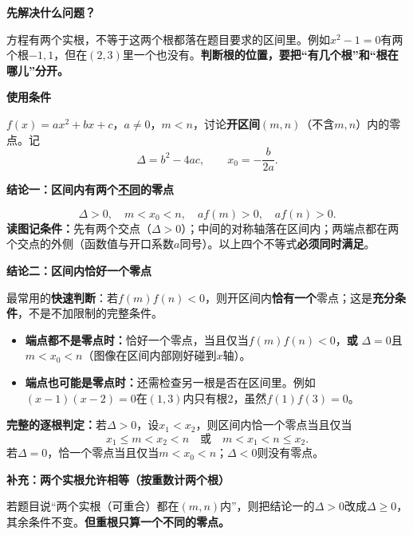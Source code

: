 \begin{statementbox}
\textbf{\textcolor{CStatement}{先解决什么问题？}}\par
方程有两个实根，不等于这两个根都落在题目要求的区间里。例如$x^2-1=0$有两个根$-1,1$，但在$(2,3)$里一个也没有。\textbf{判断根的位置，要把“有几个根”和“根在哪儿”分开。}

\medskip
\textbf{\textcolor{CStatement}{使用条件}}\par
$f(x)=ax^2+bx+c$，$a\ne0$，$m<n$，讨论\textbf{开区间}$(m,n)$（不含$m,n$）内的零点。记
\[\Delta=b^2-4ac,\qquad x_0=-\frac b{2a}.\]

\textbf{\textcolor{CStatement}{结论一：区间内有两个\underline{不同}的零点}}\par
\[
\boxed{\Delta>0,\quad m<x_0<n,\quad af(m)>0,\quad af(n)>0.}
\]
\textbf{读图记条件：}先有两个交点（$\Delta>0$）；中间的对称轴落在区间内；两端点都在两个交点的外侧（函数值与开口系数$a$同号）。以上四个不等式\textbf{必须同时满足}。
\begin{center}

\end{center}

\end{statementbox}
\begin{statementbox}
\textbf{\textcolor{CStatement}{结论二：区间内恰好一个零点}}\par
最常用的\textbf{快速判断}：若$f(m)f(n)<0$，则开区间内\textbf{恰有一个}零点；这是\textbf{充分条件}，不是不加限制的完整条件。
\begin{itemize}[leftmargin=*,itemsep=.3em]
 \item \textbf{端点都不是零点时：}恰好一个零点，当且仅当$f(m)f(n)<0$，\textbf{或} $\Delta=0$且$m<x_0<n$（图像在区间内部刚好碰到$x$轴）。
 \item \textbf{端点也可能是零点时：}还需检查另一根是否在区间里。例如$(x-1)(x-2)=0$在$(1,3)$内只有根$2$，虽然$f(1)f(3)=0$。
\end{itemize}
\textbf{完整的逐根判定：}若$\Delta>0$，设$x_1<x_2$，则区间内恰一个零点当且仅当
\[
 x_1\le m<x_2<n\quad\text{或}\quad m<x_1<n\le x_2.
\]
若$\Delta=0$，恰一个零点当且仅当$m<x_0<n$；$\Delta<0$则没有零点。

\textbf{\textcolor{CStatement}{补充：两个实根允许相等（按重数计两个根）}}\par
若题目说“两个实根（可重合）都在$(m,n)$内”，则把结论一的$\Delta>0$改成$\Delta\ge0$，其余条件不变。\textbf{但重根只算一个不同的零点。}
\end{statementbox}
